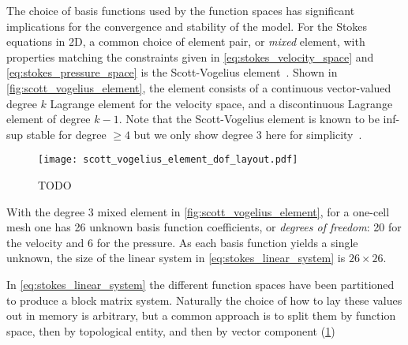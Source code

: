 \documentclass[thesis]{subfiles}
\begin{document}
The choice of basis functions used by the function spaces has significant implications for the convergence and stability of the model.
For the Stokes equations in 2D, a common choice of element pair, or \textit{mixed} element, with properties matching the constraints given in \cref{eq:stokes_velocity_space} and \cref{eq:stokes_pressure_space} is the Scott-Vogelius element~\cite{scottNormEstimatesMaximal1985}.
Shown in \cref{fig:scott_vogelius_element}, the element consists of a continuous vector-valued degree $k$ Lagrange element for the velocity space, and a discontinuous Lagrange element of degree $k-1$.
Note that the Scott-Vogelius element is known to be inf-sup stable for degree $\geq 4$ but we only show degree 3 here for simplicity~\cite{guzmanScottVogeliusFiniteElements2018}.

\begin{figure}
  \centering
  \texttt{[image: scott\_vogelius\_element\_dof\_layout.pdf]}
  \caption{TODO}
  \label{fig:scott_vogelius_element_dof_layout}
\end{figure}

With the degree 3 mixed element in \cref{fig:scott_vogelius_element}, for a one-cell mesh one has 26 unknown basis function coefficients, or \textit{degrees of freedom}: 20 for the velocity and 6 for the pressure.
As each basis function yields a single unknown, the size of the linear system in \cref{eq:stokes_linear_system} is $26 \times 26$.

In \cref{eq:stokes_linear_system} the different function spaces have been partitioned to produce a block matrix system.
Naturally the choice of how to lay these values out in memory is arbitrary, but a common approach is to split them by function space, then by topological entity, and then by vector component (\cref{fig:scott_vogelius_element_dof_layout})


\end{document}
